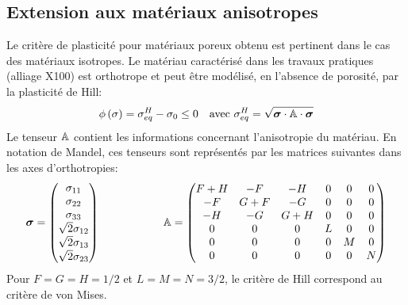 \documentclass[french,english,12pt]{exam}
\begin{document}
\begin{questions}
\section{Extension aux matériaux anisotropes}
Le critère de plasticité pour matériaux poreux obtenu est pertinent dans le cas des matériaux isotropes. Le matériau caractérisé dans les travaux pratiques (alliage X100) est orthotrope et peut être modélisé, en l'absence de porosité, par la plasticité de Hill:
\begin{equation}
  \phi\left( \sigma   \right) =  \sigma_{eq}^H - \sigma_0 \leq 0 \quad \text{avec } \sigma_{eq}^H = \sqrt{ \boldsymbol{\sigma} \cdot \mathbb{A} \cdot \boldsymbol{\sigma}}
  \label{eq100}
\end{equation}
Le tenseur $\mathbb{A}$ contient les informations concernant l'anisotropie du matériau. En notation de Mandel, ces tenseurs sont représentés par les matrices suivantes dans les axes d'orthotropies:
\begin{equation}
  \boldsymbol{\sigma} = \begin{pmatrix}
    \sigma_{11} \\
    \sigma_{22} \\
    \sigma_{33} \\
    \sqrt{2}\sigma_{12} \\
    \sqrt{2}\sigma_{13} \\
    \sqrt{2}\sigma_{23} \\
  \end{pmatrix} \hspace{2cm}
  \mathbb{A} = \begin{pmatrix}
    F + H & -F & -H & 0 & 0 & 0 \\
    -F & G+ F & -G & 0 & 0 & 0 \\
    -H & -G & G+H & 0 & 0 & 0 \\
    0 & 0 & 0 & L & 0 & 0 \\
    0 & 0 & 0 & 0 & M & 0 \\
    0 & 0 & 0 & 0 & 0 & N \\
    \end{pmatrix}
\end{equation}
Pour $F = G = H = 1/2$ et $L = M = N = 3/2$, le critère de Hill correspond au critère de von Mises.


\end{questions}
\end{document}
